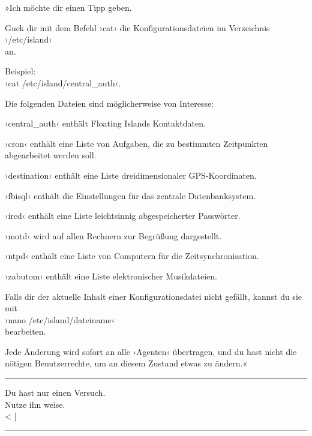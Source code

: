 »Ich möchte dir einen Tipp geben.

Guck dir mit dem Befehl ›cat‹ die Konfigurationsdateien im Verzeichnis\\
›/etc/island‹\\
an.

Beispiel:\\
›cat /etc/island/central\_auth‹.

Die folgenden Dateien sind möglicherweise von Interesse:

›central\_auth‹ enthält Floating Islands Kontaktdaten.

›cron‹ enthält eine Liste von Aufgaben, die zu bestimmten Zeitpunkten abgearbeitet werden soll.

›destination‹ enthält eine Liste dreidimensionaler GPS-Koordinaten.

›fbisql‹ enthält die Einstellungen für das zentrale Datenbanksystem.

›ircd‹ enthält eine Liste leichtsinnig abgespeicherter Passwörter.

›motd‹ wird auf allen Rechnern zur Begrüßung dargestellt.

›ntpd‹ enthält eine Liste von Computern für die Zeitsynchronisation.

›zabutom‹ enthält eine Liste elektronischer Musikdateien.

Falls dir der aktuelle Inhalt einer Konfigurationsdatei nicht gefällt, kannst du sie mit\\
›nano /etc/island/dateiname‹\\
bearbeiten.

Jede Änderung wird sofort an alle ›Agenten‹ übertragen, und du hast nicht die nötigen Benutzerrechte, um an diesem Zustand etwas zu ändern.«

\noindent \parbox{\textwidth}{ \vspace{3ex} \hrule \vspace{3ex}

    \begin{tiny}
    \begin{ttfamily}

\noindent Du hast nur einen Versuch.\\
\noindent Nutze ihn weise.\\
\noindent \textless{} |

    \end{ttfamily}
    \end{tiny}

\vspace{3ex} \hrule \vspace{3ex} }

